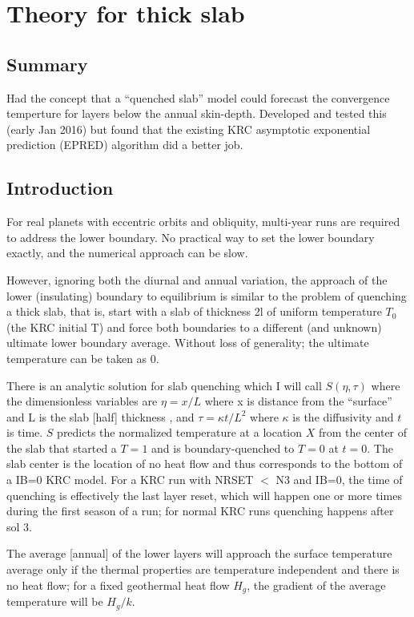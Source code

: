 
\section{Theory for thick slab}
\subsection{Summary}
Had the concept that a ``quenched slab'' model could forecast the convergence temperture for layers below the annual skin-depth. Developed and tested this (early Jan 2016) but found that the existing KRC asymptotic exponential prediction (EPRED) algorithm did a better job.

\subsection{Introduction}

For real planets with eccentric orbits and obliquity, multi-year runs are
required to address the lower boundary. No practical way to set the lower
boundary exactly, and the numerical approach can be slow.

 However, ignoring both the diurnal and annual variation, the approach of the
 lower (insulating) boundary to equilibrium is similar to the problem of
 quenching a thick slab, that is, start with a slab of thickness 2l of uniform
 temperature $T_0$ (the KRC initial T) and force both boundaries to a
 different (and unknown) ultimate lower boundary average. Without loss of
 generality; the ultimate temperature can be taken as 0.

There is an analytic solution for slab quenching which I will call $
S(\eta,\tau)$ where the dimensionless variables are $\eta=x/L$ where x is
distance from the ``surface'' and L is the slab [half] thickness , and $\tau =
\kappa t/L^2$ where $\kappa$ is the diffusivity and $t$ is time. $S$ predicts
the normalized temperature at a location $X$ from the center of the slab that
started a $T=1$ and is boundary-quenched to $T=0$ at $t=0$. The slab center is
the location of no heat flow and thus corresponds to the bottom of a IB=0 KRC
model. For a KRC run with NRSET $<$ N3 and IB=0, the time of quenching is
effectively the last layer reset, which will happen one or more times during the
first season of a run; for normal KRC runs quenching happens after sol 3.

The average [annual] of the lower layers will approach the surface temperature
average only if the thermal properties are temperature independent and there is
no heat flow; for a fixed geothermal heat flow $H_g$, the gradient of the average
temperature will be $H_g/k$.

